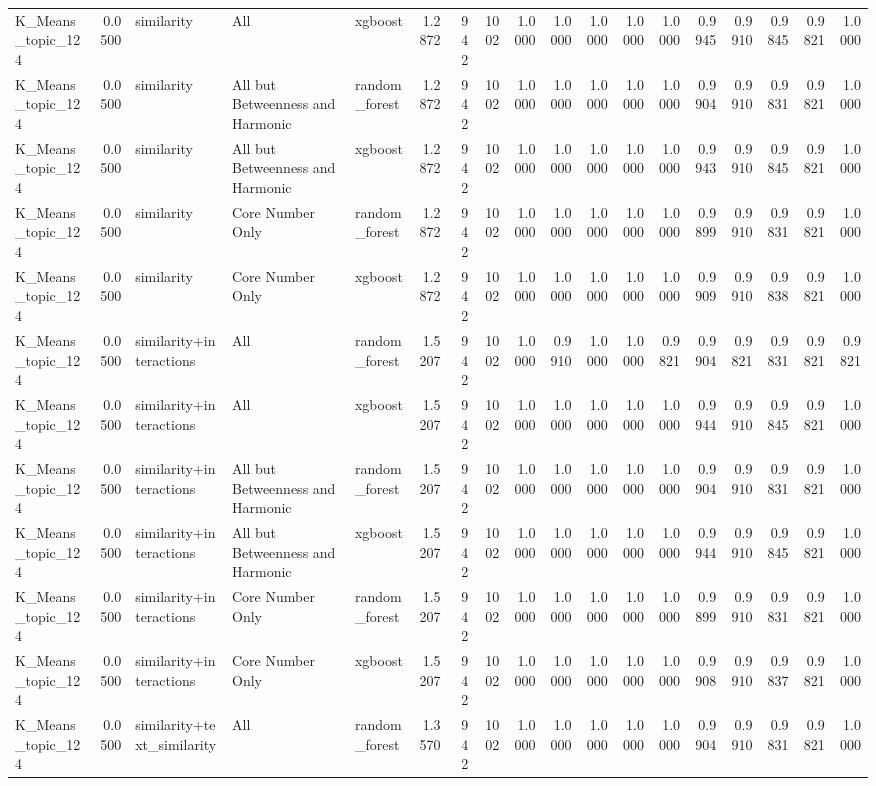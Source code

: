\begin{tabular}{lrlllrrrrrrrrrrrrr}
K_Means_topic_124 & 0.0500 & similarity & All & xgboost & 1.2872 & 942 & 1002 & 1.0000 & 1.0000 & 1.0000 & 1.0000 & 1.0000 & 0.9945 & 0.9910 & 0.9845 & 0.9821 & 1.0000 \\
K_Means_topic_124 & 0.0500 & similarity & All but Betweenness and Harmonic & random_forest & 1.2872 & 942 & 1002 & 1.0000 & 1.0000 & 1.0000 & 1.0000 & 1.0000 & 0.9904 & 0.9910 & 0.9831 & 0.9821 & 1.0000 \\
K_Means_topic_124 & 0.0500 & similarity & All but Betweenness and Harmonic & xgboost & 1.2872 & 942 & 1002 & 1.0000 & 1.0000 & 1.0000 & 1.0000 & 1.0000 & 0.9943 & 0.9910 & 0.9845 & 0.9821 & 1.0000 \\
K_Means_topic_124 & 0.0500 & similarity & Core Number Only & random_forest & 1.2872 & 942 & 1002 & 1.0000 & 1.0000 & 1.0000 & 1.0000 & 1.0000 & 0.9899 & 0.9910 & 0.9831 & 0.9821 & 1.0000 \\
K_Means_topic_124 & 0.0500 & similarity & Core Number Only & xgboost & 1.2872 & 942 & 1002 & 1.0000 & 1.0000 & 1.0000 & 1.0000 & 1.0000 & 0.9909 & 0.9910 & 0.9838 & 0.9821 & 1.0000 \\
K_Means_topic_124 & 0.0500 & similarity+interactions & All & random_forest & 1.5207 & 942 & 1002 & 1.0000 & 0.9910 & 1.0000 & 1.0000 & 0.9821 & 0.9904 & 0.9821 & 0.9831 & 0.9821 & 0.9821 \\
K_Means_topic_124 & 0.0500 & similarity+interactions & All & xgboost & 1.5207 & 942 & 1002 & 1.0000 & 1.0000 & 1.0000 & 1.0000 & 1.0000 & 0.9944 & 0.9910 & 0.9845 & 0.9821 & 1.0000 \\
K_Means_topic_124 & 0.0500 & similarity+interactions & All but Betweenness and Harmonic & random_forest & 1.5207 & 942 & 1002 & 1.0000 & 1.0000 & 1.0000 & 1.0000 & 1.0000 & 0.9904 & 0.9910 & 0.9831 & 0.9821 & 1.0000 \\
K_Means_topic_124 & 0.0500 & similarity+interactions & All but Betweenness and Harmonic & xgboost & 1.5207 & 942 & 1002 & 1.0000 & 1.0000 & 1.0000 & 1.0000 & 1.0000 & 0.9944 & 0.9910 & 0.9845 & 0.9821 & 1.0000 \\
K_Means_topic_124 & 0.0500 & similarity+interactions & Core Number Only & random_forest & 1.5207 & 942 & 1002 & 1.0000 & 1.0000 & 1.0000 & 1.0000 & 1.0000 & 0.9899 & 0.9910 & 0.9831 & 0.9821 & 1.0000 \\
K_Means_topic_124 & 0.0500 & similarity+interactions & Core Number Only & xgboost & 1.5207 & 942 & 1002 & 1.0000 & 1.0000 & 1.0000 & 1.0000 & 1.0000 & 0.9908 & 0.9910 & 0.9837 & 0.9821 & 1.0000 \\
K_Means_topic_124 & 0.0500 & similarity+text_similarity & All & random_forest & 1.3570 & 942 & 1002 & 1.0000 & 1.0000 & 1.0000 & 1.0000 & 1.0000 & 0.9904 & 0.9910 & 0.9831 & 0.9821 & 1.0000 \\

\end{tabular}
